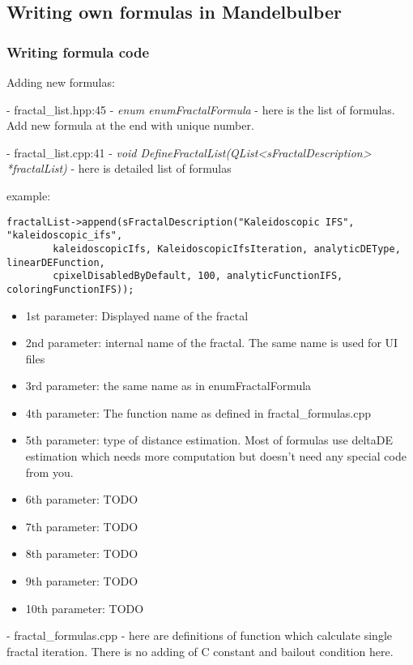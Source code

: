 \subsection{Writing own formulas in Mandelbulber}\label{developers-writing-own-formulas}
\subsubsection{Writing formula code}\label{developers-writing-formula-code}

Adding new formulas:

- fractal\_list.hpp:45 - \emph{enum enumFractalFormula} - here is the list of formulas. Add new formula at the end with unique number.

- fractal\_list.cpp:41 - \emph{void DefineFractalList(QList<sFractalDescription> *fractalList)} - here is detailed list of formulas

example:
\begin{lstlisting}
fractalList->append(sFractalDescription("Kaleidoscopic IFS", "kaleidoscopic_ifs",
		kaleidoscopicIfs, KaleidoscopicIfsIteration, analyticDEType, linearDEFunction,
		cpixelDisabledByDefault, 100, analyticFunctionIFS, coloringFunctionIFS));
\end{lstlisting}

\begin{itemize}
	\item 1st parameter: Displayed name of the fractal
	\item 2nd parameter: internal name of the fractal. The same name is used for UI files
	\item 3rd parameter: the same name as in enumFractalFormula
	\item 4th parameter: The function name as defined in fractal\_formulas.cpp
	\item 5th parameter: type of distance estimation. Most of formulas use deltaDE estimation which needs more computation
		but doesn't need any special code from you.
	\item 6th parameter: TODO
	\item 7th parameter: TODO
	\item 8th parameter: TODO
	\item 9th parameter: TODO
	\item 10th parameter: TODO
\end{itemize}

- fractal\_formulas.cpp - here are definitions of function which calculate single fractal iteration. There is no adding of C constant and bailout condition here.

